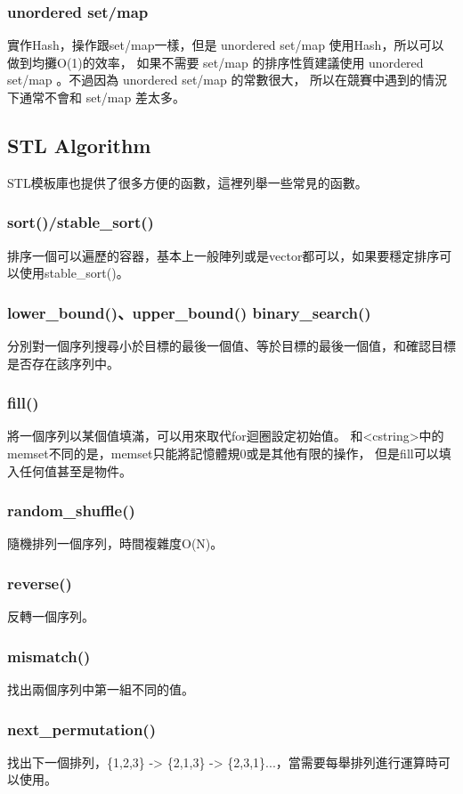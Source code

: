 \documentclass{article}
\begin{document}
\subsubsection{unordered set/map}
實作Hash，操作跟set/map一樣，但是 unordered set/map 使用Hash，所以可以做到均攤O(1)的效率，
如果不需要 set/map 的排序性質建議使用 unordered set/map 。不過因為 unordered set/map 的常數很大，
所以在競賽中遇到的情況下通常不會和 set/map 差太多。

\subsection{STL Algorithm}
STL模板庫也提供了很多方便的函數，這裡列舉一些常見的函數。
\subsubsection{sort()/stable\_sort()}
排序一個可以遍歷的容器，基本上一般陣列或是vector都可以，如果要穩定排序可以使用stable\_sort()。
\subsubsection{lower\_bound()、upper\_bound() binary\_search()}
分別對一個序列搜尋小於目標的最後一個值、等於目標的最後一個值，和確認目標是否存在該序列中。
\subsubsection{fill()}
將一個序列以某個值填滿，可以用來取代for迴圈設定初始值。
和<cstring>中的memset不同的是，memset只能將記憶體規0或是其他有限的操作，
但是fill可以填入任何值甚至是物件。
\subsubsection{random\_shuffle()}
隨機排列一個序列，時間複雜度O(N)。
\subsubsection{reverse()}
反轉一個序列。
\subsubsection{mismatch()}
找出兩個序列中第一組不同的值。
\subsubsection{next\_permutation()}
找出下一個排列，\{1,2,3\} -> \{2,1,3\} -> \{2,3,1\}...，當需要每舉排列進行運算時可以使用。
\end{document}
